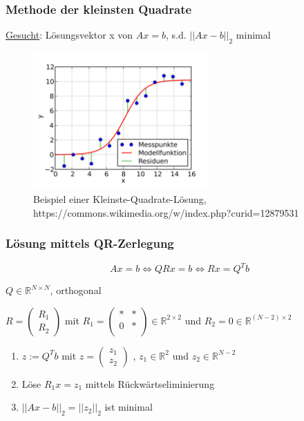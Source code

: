 \documentclass{beamer}
\begin{document}
\begin{frame} %
  \frametitle{Methode der kleinsten Quadrate} %
  \underline{Gesucht}: Lösungsvektor x von $Ax=b$, s.d. $||Ax-b||_2$ minimal
  \begin{figure}
    \centering
      \includegraphics[width=0.6\textwidth]{least_squares_example}
    \caption{Beispiel einer Kleinste-Quadrate-Lösung, https://commons.wikimedia.org/w/index.php?curid=12879531}
  \end{figure}
\end{frame}

\begin{frame} %
  \frametitle{Lösung mittels QR-Zerlegung} %
  \begin{equation*}
    Ax = b \iff QRx = b \iff Rx = Q^T b
  \end{equation*}
\bigskip

\centering
  $Q \in \mathbb{R}^{N\times N}$, orthogonal
\bigskip

  $R=
    \begin{pmatrix}
      R_1 \\
      R_2
    \end{pmatrix}$
  mit
  $R_1=
  \begin{pmatrix}
    *     & * \\
    0     & *\\
  \end{pmatrix} \in \mathbb{R}^{2\times 2}$
  und
  $R_2=0  \in \mathbb{R}^{(N-2)\times 2}$

\pause
\bigskip

  \begin{enumerate}
    \item $z := Q^T b$ mit
    $z =
    \begin{pmatrix}
      z_1 \\
      z_2
    \end{pmatrix}$
    , $z_1 \in \mathbb{R}^{2}$ und $z_2 \in \mathbb{R}^{N-2}$
    \pause
    \item Löse $R_1 x = z_1$ mittels Rückwärtseliminierung
    \pause
    \item $||Ax-b||_2 = ||z_2||_2$ ist minimal
  \end{enumerate}
\end{frame}
\end{document}
